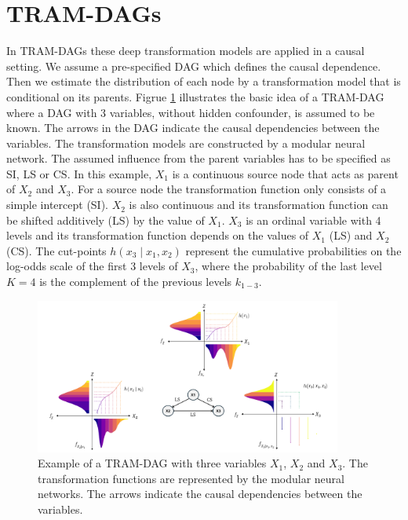 \section{TRAM-DAGs}



In TRAM-DAGs these deep transformation models are applied in a causal setting. We assume a pre-specified DAG which defines the causal dependence. Then we estimate the distribution of each node by a transformation model that is conditional on its parents. Figrue \ref{fig:tram_dag} illustrates the basic idea of a TRAM-DAG where a DAG with 3 variables, without hidden confounder, is assumed to be known. The arrows in the DAG indicate the causal dependencies between the variables. The transformation models are constructed by a modular neural network. The assumed influence from the parent variables has to be specified as SI, LS or CS. In this example, $X_1$ is a continuous source node that acts as parent of $X_2$ and $X_3$. For a source node the transformation function only consists of a simple intercept (SI). $X_2$ is also continuous and its transformation function can be shifted additively (LS) by the value of $X_1$. $X_3$ is an ordinal variable with 4 levels and its transformation function depends on the values of $X_1$ (LS) and $X_2$ (CS). The cut-points $h(x_3 \mid x_1, x_2)$ represent the cumulative probabilities on the log-odds scale of the first 3 levels of $X_3$, where the probability of the last level $K=4$ is the complement of the previous levels $k_{1-3}$.

\begin{figure}[H]
\centering
\includegraphics[width=0.9\textwidth]{img/tram_dag.png}
\caption{Example of a TRAM-DAG with three variables $X_1$, $X_2$ and $X_3$. The transformation functions are represented by the modular neural networks. The arrows indicate the causal dependencies between the variables.}
\label{fig:tram_dag}
\end{figure}

